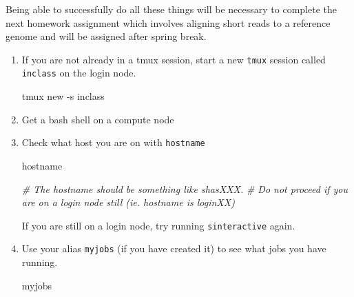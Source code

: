 \documentclass[]{krantz}
\makeatletter
\newenvironment{Shaded}{\begin{snugshade}}{\end{snugshade}}
\newcommand{\CommentTok}[1]{\textcolor[rgb]{0.37,0.37,0.37}{\textit{#1}}}
\newcommand{\ExtensionTok}[1]{#1}
\newcommand{\FunctionTok}[1]{\textcolor[rgb]{0,0,0}{#1}}
\newcommand{\NormalTok}[1]{#1}
\newcommand{\VariableTok}[1]{\textcolor[rgb]{0,0,0}{#1}}
\newenvironment{kframe}{%
\medskip{}
\setlength{\fboxsep}{.8em}
 \def\at@end@of@kframe{}%
 \ifinner\ifhmode%
  \def\at@end@of@kframe{\end{minipage}}%
  \begin{minipage}{\columnwidth}%
 \fi\fi%
 \def\FrameCommand##1{\hskip\@totalleftmargin \hskip-\fboxsep
 \colorbox{shadecolor}{##1}\hskip-\fboxsep
     \hskip-\linewidth \hskip-\@totalleftmargin \hskip\columnwidth}%
 \MakeFramed {\advance\hsize-\width
   \@totalleftmargin\z@ \linewidth\hsize
   \@setminipage}}%
 {\par\unskip\endMakeFramed%
 \at@end@of@kframe}
\renewenvironment{Shaded}{\begin{kframe}}{\end{kframe}}
\makeatother
\begin{document}
Being able to successfully do all these things will be necessary to complete
the next homework assignment which involves aligning short reads to a reference
genome and will be assigned after spring break.

\begin{enumerate}
\def\labelenumi{\arabic{enumi}.}
\item
  If you are not already in a tmux session, start a new \texttt{tmux} session called \texttt{inclass} on the login node.

\begin{Shaded}
\begin{Highlighting}[]
\ExtensionTok{tmux}\NormalTok{ new -s inclass}
\end{Highlighting}
\end{Shaded}
\item
  Get a bash shell on a compute node

\begin{Shaded}
\end{Shaded}
\item
  Check what host you are on with \texttt{hostname}

\begin{Shaded}
\begin{Highlighting}[]
\FunctionTok{hostname}

\CommentTok{# The hostname should be something like shasXXX. }
\CommentTok{#  Do not proceed if you are on a login node still (ie. hostname is loginXX)}
\end{Highlighting}
\end{Shaded}

  If you are still on a login node, try running \texttt{sinteractive} again.
\item
  Use your alias \texttt{myjobs} (if you have created it) to see what jobs you have running.

\begin{Shaded}
\begin{Highlighting}[]
\ExtensionTok{myjobs}


\end{Highlighting}
\end{Shaded}
\end{enumerate}
\end{document}
